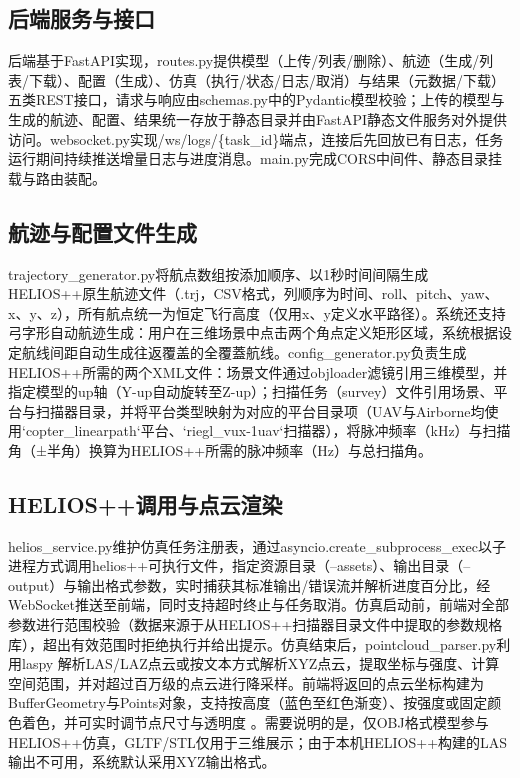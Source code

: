 \documentclass[a4paper,fleqn]{cas-sc}
\begin{document}
\subsection{后端服务与接口}
后端基于FastAPI实现，routes.py提供模型（上传/列表/删除）、航迹（生成/列表/下载）、配置（生成）、仿真（执行/状态/日志/取消）与结果（元数据/下载）五类REST接口，请求与响应由schemas.py中的Pydantic模型校验；上传的模型与生成的航迹、配置、结果统一存放于静态目录并由FastAPI静态文件服务对外提供访问。websocket.py实现/ws/logs/\{task\_id\}端点，连接后先回放已有日志，任务运行期间持续推送增量日志与进度消息。main.py完成CORS中间件、静态目录挂载与路由装配。

\subsection{航迹与配置文件生成}
trajectory\_generator.py将航点数组按添加顺序、以1秒时间间隔生成HELIOS++原生航迹文件（.trj，CSV格式，列顺序为时间、roll、pitch、yaw、x、y、z），所有航点统一为恒定飞行高度（仅用x、y定义水平路径）。系统还支持弓字形自动航迹生成：用户在三维场景中点击两个角点定义矩形区域，系统根据设定航线间距自动生成往返覆盖的全覆蓋航线。config\_generator.py负责生成HELIOS++所需的两个XML文件：场景文件通过objloader滤镜引用三维模型，并指定模型的up轴（Y-up自动旋转至Z-up）；扫描任务（survey）文件引用场景、平台与扫描器目录，并将平台类型映射为对应的平台目录项（UAV与Airborne均使用`copter\_linearpath`平台、`riegl\_vux-1uav`扫描器），将脉冲频率（kHz）与扫描角（±半角）换算为HELIOS++所需的脉冲频率（Hz）与总扫描角。

\subsection{HELIOS++调用与点云渲染}
helios\_service.py维护仿真任务注册表，通过asyncio.create\_subprocess\_exec以子进程方式调用helios++可执行文件，指定资源目录（--assets）、输出目录（--output）与输出格式参数，实时捕获其标准输出/错误流并解析进度百分比，经WebSocket推送至前端，同时支持超时终止与任务取消。仿真启动前，前端对全部参数进行范围校验（数据来源于从HELIOS++扫描器目录文件中提取的参数规格库），超出有效范围时拒绝执行并给出提示。仿真结束后，pointcloud\_parser.py利用laspy \citep{laspy} 解析LAS/LAZ点云或按文本方式解析XYZ点云，提取坐标与强度、计算空间范围，并对超过百万级的点云进行降采样。前端将返回的点云坐标构建为BufferGeometry与Points对象，支持按高度（蓝色至红色渐变）、按强度或固定颜色着色，并可实时调节点尺寸与透明度 \citep{pointCloudRendering}。需要说明的是，仅OBJ格式模型参与HELIOS++仿真，GLTF/STL仅用于三维展示；由于本机HELIOS++构建的LAS输出不可用，系统默认采用XYZ输出格式。
\end{document}
